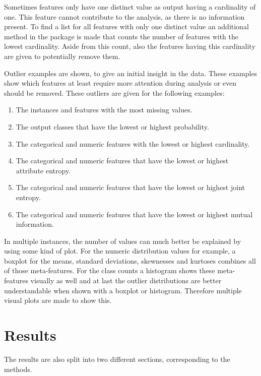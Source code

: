 \documentclass[10pt,a4paper]{report}
\begin{document}
	Sometimes features only have one distinct value as output having a cardinality of one. This feature cannot contribute to the analysis, as there is no information present. To find a list for all features with only one distinct value an additional method in the package is made that counts the number of features with the lowest cardinality. Aside from this count, also the features having this cardinality are given to potentially remove them.
	
	Outlier examples are shown, to give an initial insight in the data. These examples show which features at least require more attention during analysis or even should be removed. These outliers are given for the following examples:
	
	\begin{enumerate}
		\item The instances and features with the most missing values.
		\item The output classes that have the lowest or highest probability.
		\item The categorical and numeric features with the lowest or highest cardinality.
		\item The categorical and numeric features that have the lowest or highest attribute entropy.
		\item The categorical and numeric features that have the lowest or highest joint entropy.
		\item The categorical and numeric features that have the lowest or highest mutual information.
	\end{enumerate}	
	
	In multiple instances, the number of values can much better be explained by using some kind of plot. For the numeric distribution values for example, a boxplot for the means, standard deviations, skewnesses and kurtoses combines all of those meta-features. For the class counts a histogram shows these meta-features visually as well and at last the outlier distributions are better understandable when shown with a boxplot or histogram. Therefore multiple visual plots are made to show this.
	
	\section{Results}
	\label{DEsec:Results}
	
	The results are also split into two different sections, corresponding to the methods.
	
\end{document}
